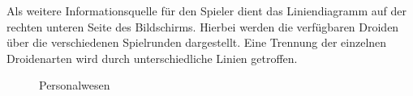 Als weitere Informationsquelle für den Spieler dient das Liniendiagramm auf der rechten unteren Seite des Bildschirms. Hierbei werden die verfügbaren Droiden über die verschiedenen Spielrunden dargestellt. Eine Trennung der einzelnen Droidenarten wird durch unterschiedliche Linien getroffen. 

\begin{figure}[h]
  \centering
  \caption{Personalwesen}
  \label{img:ui-personalwesen}
\end{figure}
